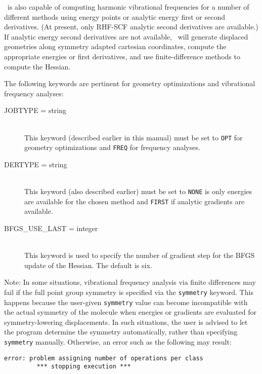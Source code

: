 \PSIthree\ is also capable of computing harmonic vibrational frequencies
for a number of different methods using energy points or analytic energy first or
second derivatives.  (At present, only RHF-SCF analytic second derivatives
are available.)  If analytic energy second derivatives are not available,
\PSIthree\ will generate displaced geometries along symmetry adapted cartesian
coordinates, compute the appropriate energies or first derivatives, and use finite-difference
methods to compute the Hessian.

The following keywords are pertinent for geometry optimizations and
vibrational frequency analyses:
\begin{description}
\item[JOBTYPE = string]\mbox{}\\
This keyword (described earlier in this manual) must be set to
{\tt OPT} for geometry optimizations and {\tt FREQ} for frequency analyses.
\item[DERTYPE = string]\mbox{}\\
This keyword (also described earlier) must be set to {\tt NONE} is only
energies are available for the chosen method and {\tt FIRST} if analytic
gradients are available.
\item[BFGS\_USE\_LAST = integer]\mbox{}\\ This keyword is used to specify
the number of gradient step for the BFGS update of the Hessian.  The default
is six.  
\end{description}

\begin{em}
Note: In some situations, vibrational frequency analysis via finite
differences may fail if the full point group symmetry is specified via 
the {\tt symmetry} keyword.  This happens because the user-given
{\tt symmetry} value can become incompatible with the actual symmetry
of the molecule when energies or gradients are evaluated for 
symmetry-lowering displacements.  In such situations, the user is 
advised to let the program determine the symmetry automatically, rather
than specifying {\tt symmetry} manually.  Otherwise, an error such as the
following may result:
\end{em}

\begin{verbatim}
error: problem assigning number of operations per class
         *** stopping execution ***
\end{verbatim}

